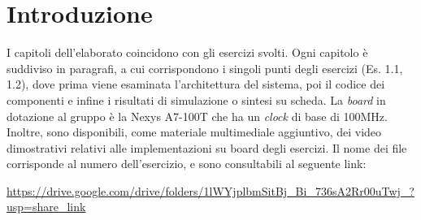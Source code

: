 \chapter*{Introduzione}


I capitoli dell'elaborato coincidono con gli esercizi svolti. Ogni capitolo è suddiviso in paragrafi, a cui corrispondono i singoli punti degli esercizi (Es. 1.1, 1.2), dove prima viene esaminata l'architettura del sistema, poi il codice dei componenti e infine i risultati di simulazione o sintesi su scheda. La \textit{board} in dotazione al gruppo è la Nexys A7-100T che ha un \textit{clock} di base di 100MHz.
Inoltre, sono disponibili, come materiale multimediale aggiuntivo, dei video dimostrativi relativi alle implementazioni su board degli esercizi. Il nome dei file corrisponde al numero dell'esercizio, e sono consultabili al seguente link:

\url{https://drive.google.com/drive/folders/1lWYjplbmSitBj_Bi_736sA2Rr00uTwj_?usp=share_link}

